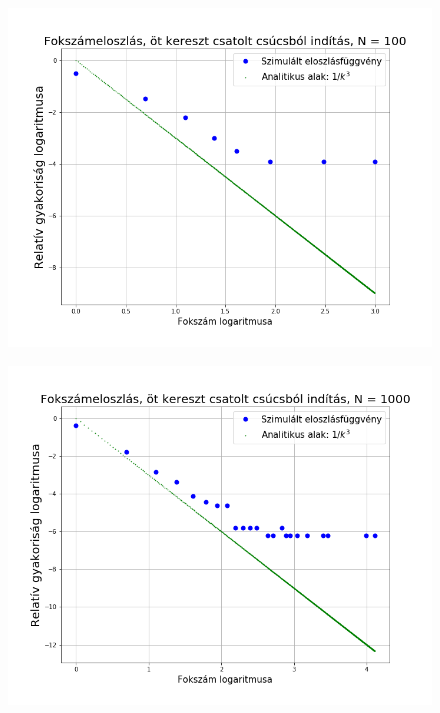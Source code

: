 \documentclass[a4paper, 12pt]{article}
\numberwithin{equation}{section}          %
\numberwithin{figure}{subsection}
\begin{document}
\begin{figure}[ch!]
	\begin{center}
		\includegraphics[width=1\textwidth]{harmadik100log.png}
	\end{center}
\end{figure}
\clearpage
\begin{figure}[c!]
	\begin{center}
		\includegraphics[width=1\textwidth]{harmadik1000log.png}
	\end{center}
\end{figure}
\clearpage
\end{document}
